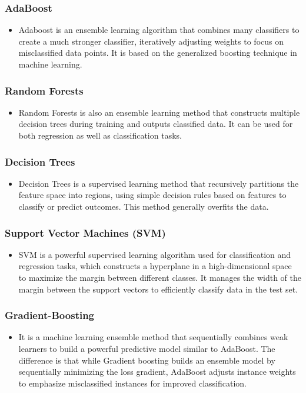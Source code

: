 \documentclass[a4paper]{article}
\theoremstyle{plain}
\theoremstyle{definition}
\begin{document}
{\subsubsection {AdaBoost}
\begin{itemize}
    \item[] 
   Adaboost is an ensemble learning algorithm that combines many classifiers to create a much stronger classifier, iteratively adjusting weights to focus on misclassified data points. It is based on the generalized boosting technique in machine learning.

\end{itemize}
\subsubsection {Random Forests}
\begin{itemize}
    \item[] 
    Random Forests is also an ensemble learning method that constructs multiple decision trees during training and outputs classified data. It can be used for both regression as well as classification tasks. 

\end{itemize}
\subsubsection {Decision Trees}
\begin{itemize}
    \item[]
Decision Trees is a supervised learning method that recursively partitions the feature space into regions, using simple decision rules based on features to classify or predict outcomes. This method generally overfits the data.
\end{itemize}
\subsubsection {Support Vector Machines (SVM)} 
\begin{itemize}
    \item[] SVM is a powerful supervised learning algorithm used for classification and regression tasks, which constructs a hyperplane in a high-dimensional space to maximize the margin between different classes. It manages the width of the margin between the support vectors to efficiently classify data in the test set.
\end{itemize}
\subsubsection {Gradient-Boosting} 
\begin {itemize} 
\item [] It is a machine learning ensemble method that sequentially combines weak learners to build a powerful predictive model similar to AdaBoost. The difference is that while Gradient boosting builds an ensemble model by sequentially minimizing the loss gradient, AdaBoost adjusts instance weights to emphasize misclassified instances for improved classification.
\end{itemize}
\newpage
}
\end{document}
